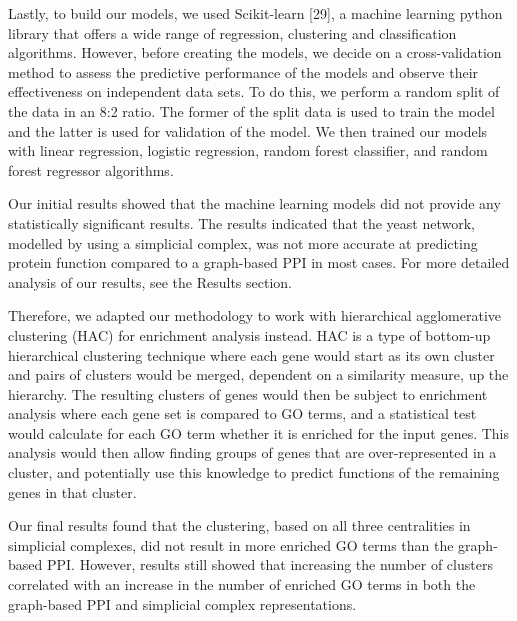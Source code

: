 \documentclass[9pt]{article}
\begin{document}
\par
Lastly, to build our models, we used Scikit-learn [29], a machine learning python library that offers a wide range of regression, clustering and classification algorithms. However, before creating the models, we decide on a cross-validation method to assess the predictive performance of the models and observe their effectiveness on independent data sets. To do this, we perform a random split of the data in an 8:2 ratio. The former of the split data is used to train the model and the latter is used for validation of the model. We then trained our models with linear regression, logistic regression, random forest classifier, and random forest regressor algorithms. 
\par
Our initial results showed that the machine learning models did not provide any statistically significant results. The results indicated that the yeast network, modelled by using a simplicial complex, was not more accurate at predicting protein function compared to a graph-based PPI in most cases. For more detailed analysis of our results, see the Results section.
\par
Therefore, we adapted our methodology to work with hierarchical agglomerative clustering (HAC) for enrichment analysis instead. HAC is a type of bottom-up hierarchical clustering technique where each gene would start as its own cluster and pairs of clusters would be merged, dependent on a similarity measure, up the hierarchy. The resulting clusters of genes would then be subject to enrichment analysis where each gene set is compared to GO terms, and a statistical test would calculate for each GO term whether it is enriched for the input genes. This analysis would then allow finding groups of genes that are over-represented in a cluster, and potentially use this knowledge to predict functions of the remaining genes in that cluster.
\par
Our final results found that the clustering, based on all three centralities in simplicial complexes, did not result in more enriched GO terms than the graph-based PPI. However, results still showed that increasing the number of clusters correlated with an increase in the number of enriched GO terms in both the graph-based PPI and simplicial complex representations.
\end{document}
